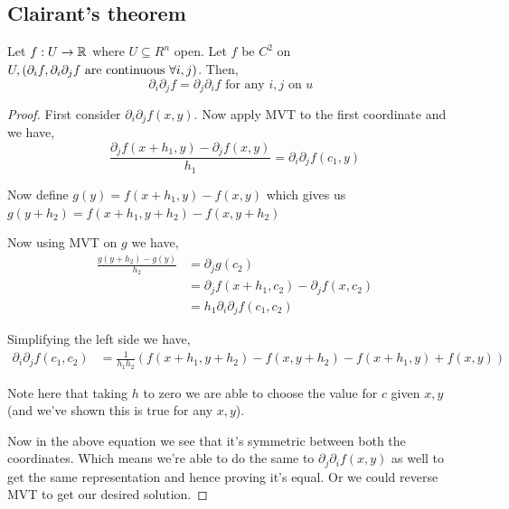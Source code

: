 \subsection*{Clairant's theorem}
\begin{theorem}
    Let $f: U \to \mathbb{R}$ where $U \subseteq R^{n}$ open. Let $f$ be $C^2$ on $U, (\partial_i f, \partial_i \partial_j f  \text{ are continuous }\\ \forall i, j)$. Then, 
    \[
        \partial_i \partial_j f = \partial_j \partial_i f \text{ for any } i,j \text{ on $u$ }
    \]
\end{theorem}
\begin{proof}
    First consider $\partial_i \partial_j f(x, y)$. Now apply MVT to the first coordinate and we have, 
    \[
        \frac{\partial_j f(x + h_1, y) - \partial_j f(x, y)}{h_1} =  \partial_i \partial_j f(c_{1}, y)
    \]

    Now define $g(y) = f(x + h_{1}, y) - f(x, y)$ which gives us $g(y + h_{2}) = f(x + h_{1}, y + h_{2}) - f(x, y + h_{2})$


    Now using MVT on $g$ we have, 
    \begin{align*}
        \frac{g(y + h_{2}) - g(y)}{h_{2}} &= \partial_j g(c_{2})\\
                                          &= \partial_j f(x + h_{1}, c_{2}) -  \partial_j f(x, c_{2})\\
                                          &= h_{1} \partial_i \partial_j f(c_{1}, c_{2})
    \end{align*}

    Simplifying the left side we have, 
    \begin{align*}
         \partial_i \partial_j f(c_{1}, c_{2}) &= \frac{1}{h_{1}h_{2}} (f(x + h_{1}, y  + h_{2}) - f(x, y + h_{2}) - f(x + h_{1}, y) + f(x, y))
    \end{align*}

    Note here that taking $h$ to zero we are able to choose the value for $c$ given $x, y$ (and we've shown this is true for any $x, y$). 
    \vspace{1em}
    
    Now in the above equation we see that it's symmetric between both the coordinates. Which means we're able to do the same to $\partial_j \partial_i f(x, y)$ as well to get the same representation and hence proving it's equal. Or we could reverse MVT to get our desired solution.
\end{proof} 


